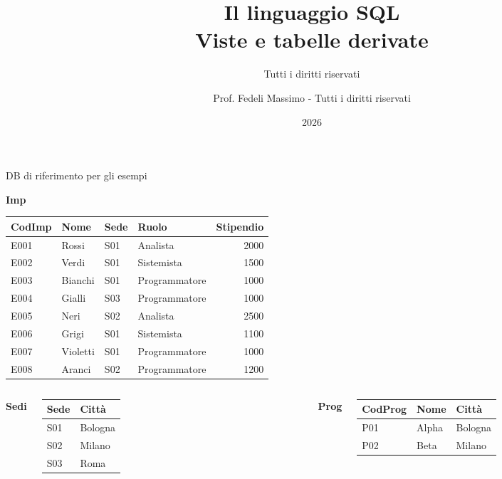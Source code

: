 \documentclass[aspectratio=169]{beamer}
\title[SQL: Viste e Table Expressions]{Il linguaggio SQL\\Viste e tabelle derivate}
\subtitle{Tutti i diritti riservati}
\author{Prof. Fedeli Massimo - Tutti i diritti riservati}
\date{2026}
\institute{Versione elettronica: 04.5.SQL.viste}
\begin{document}
\begin{frame}
  \titlepage
\end{frame}

\begin{frame}{DB di riferimento per gli esempi}

\textbf{Imp}\\[3pt]
{\small
\begin{tabular}{|l|l|l|l|r|}
  \hline
  \textbf{CodImp} & \textbf{Nome} & \textbf{Sede} & \textbf{Ruolo} & \textbf{Stipendio}\\
  \hline
  E001 & Rossi    & S01 & Analista      & 2000 \\
  E002 & Verdi    & S01 & Sistemista    & 1500 \\
  E003 & Bianchi  & S01 & Programmatore & 1000 \\
  E004 & Gialli   & S03 & Programmatore & 1000 \\
  E005 & Neri     & S02 & Analista      & 2500 \\
  E006 & Grigi    & S01 & Sistemista    & 1100 \\
  E007 & Violetti & S01 & Programmatore & 1000 \\
  E008 & Aranci   & S02 & Programmatore & 1200 \\
  \hline
\end{tabular}
}

\vspace{8pt}
\begin{columns}[T]
  \textbf{Sedi}\\[3pt]
  {\small
  \begin{tabular}{|l|l|}
    \hline
    \textbf{Sede} & \textbf{Città}\\
    \hline
    S01 & Bologna \\
    S02 & Milano  \\
    S03 & Roma    \\
    \hline
  \end{tabular}
  }
  \textbf{Prog}\\[3pt]
  {\small
  \begin{tabular}{|l|l|l|}
    \hline
    \textbf{CodProg} & \textbf{Nome} & \textbf{Città}\\
    \hline
    P01 & Alpha & Bologna \\
    P02 & Beta  & Milano  \\
    \hline
  \end{tabular}
  }
\end{columns}

\end{frame}
\end{document}
